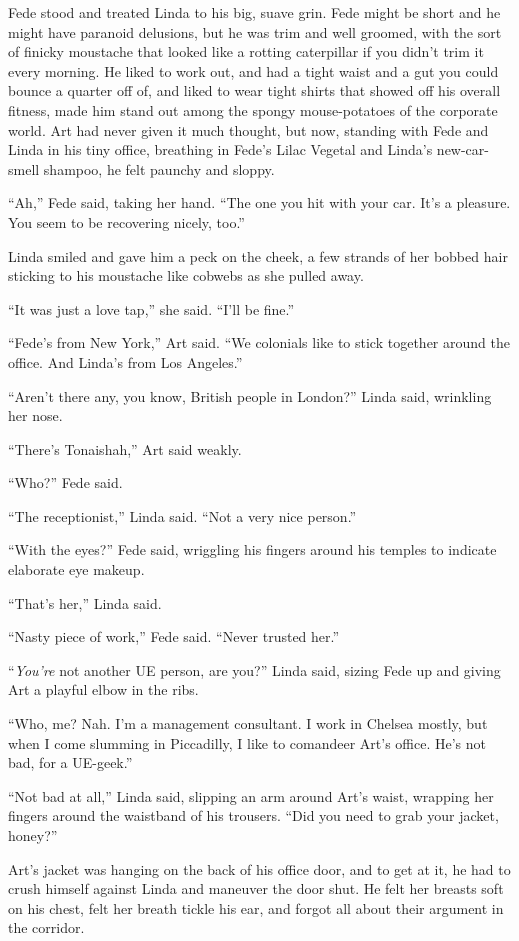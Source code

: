 Fede stood and treated Linda to his big, suave grin. Fede might be
short and he might have paranoid delusions, but he was trim and
well groomed, with the sort of finicky moustache that looked like a
rotting caterpillar if you didn’t trim it every morning. He liked
to work out, and had a tight waist and a gut you could bounce a
quarter off of, and liked to wear tight shirts that showed off his
overall fitness, made him stand out among the spongy mouse-potatoes
of the corporate world. Art had never given it much thought, but
now, standing with Fede and Linda in his tiny office, breathing in
Fede’s Lilac Vegetal and Linda’s new-car-smell shampoo, he felt
paunchy and sloppy.

“Ah,” Fede said, taking her hand. “The one you hit with your car.
It’s a pleasure. You seem to be recovering nicely, too.”

Linda smiled and gave him a peck on the cheek, a few strands of her
bobbed hair sticking to his moustache like cobwebs as she pulled
away.

“It was just a love tap,” she said. “I’ll be fine.”

“Fede’s from New York,” Art said. “We colonials like to stick
together around the office. And Linda’s from Los Angeles.”

“Aren’t there any, you know, British people in London?” Linda said,
wrinkling her nose.

“There’s Tonaishah,” Art said weakly.

“Who?” Fede said.

“The receptionist,” Linda said. “Not a very nice person.”

“With the eyes?” Fede said, wriggling his fingers around his
temples to indicate elaborate eye makeup.

“That’s her,” Linda said.

“Nasty piece of work,” Fede said. “Never trusted her.”

“\emph{You’re} not another UE person, are you?” Linda said, sizing
Fede up and giving Art a playful elbow in the ribs.

“Who, me? Nah. I’m a management consultant. I work in Chelsea
mostly, but when I come slumming in Piccadilly, I like to comandeer
Art’s office. He’s not bad, for a UE-geek.”

“Not bad at all,” Linda said, slipping an arm around Art’s waist,
wrapping her fingers around the waistband of his trousers. “Did you
need to grab your jacket, honey?”

Art’s jacket was hanging on the back of his office door, and to get
at it, he had to crush himself against Linda and maneuver the door
shut. He felt her breasts soft on his chest, felt her breath tickle
his ear, and forgot all about their argument in the corridor.

